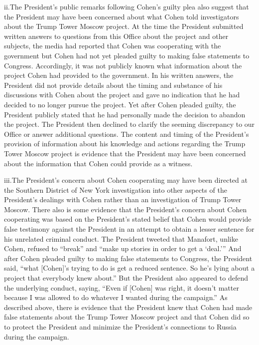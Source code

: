\qquad ii.\qquad The President's public remarks following Cohen's guilty plea also suggest that the President may have been concerned about what Cohen told investigators about the Trump Tower Moscow project.
At the time the President submitted written answers to questions from this Office about the project and other subjects, the media had reported that Cohen was cooperating with the government but Cohen had not yet pleaded guilty to making false statements to Congress.
Accordingly, it was not publicly known what information about the project Cohen had provided to the government.
In his written answers, the President did not provide details about the timing and substance of his discussions with Cohen about the project and gave no indication that he had decided to no longer pursue the project.
Yet after Cohen pleaded guilty, the President publicly stated that he had personally made the decision to abandon the project.
The President then declined to clarify the seeming discrepancy to our Office or answer additional questions.
The content and timing of the President's provision of information about his knowledge and actions regarding the Trump Tower Moscow project is evidence that the President may have been concerned about the information that Cohen could provide as a witness.

\qquad iii.\qquad The President's concern about Cohen cooperating may have been directed at the Southern District of New York investigation into other aspects of the President's dealings with Cohen rather than an investigation of Trump Tower Moscow.
There also is some evidence that the President's concern about Cohen cooperating was based on the President's stated belief that Cohen would provide false testimony against the President in an attempt to obtain a lesser sentence for his unrelated criminal conduct.
The President tweeted that Manafort, unlike Cohen, refused to ``break'' and ``make up stories in order to get a `deal.'\thinspace''
And after Cohen pleaded guilty to making false statements to Congress, the President said, ``what [Cohen]'s trying to do is get a reduced sentence.
So he's lying about a project that everybody knew about.'' But the President also appeared to defend the underlying conduct, saying, ``Even if [Cohen] was right, it doesn't matter because I was allowed to do whatever I wanted during the campaign.''
As described above, there is evidence that the President knew that Cohen had made false statements about the Trump Tower Moscow project and that Cohen did so to protect the President and minimize the President's connections to Russia during the campaign.

